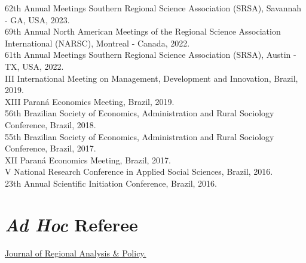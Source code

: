 \documentclass[letterpaper,11pt]{article}
\newcommand{\resumeSubHeadingListStart}{\begin{itemize}[leftmargin=0.15in, label={}]}
\newcommand{\resumeSubHeadingListEnd}{\end{itemize}}
\begin{document}
  \resumeSubHeadingListStart
    \small{\item{
        {62th Annual Meetings Southern Regional Science Association (SRSA), Savannah - GA, USA, 2023.} \\ \vspace{2pt}
        {69th Annual North American Meetings of the Regional Science Association International (NARSC), Montreal - Canada, 2022.} \\ \vspace{2pt}
        {61th Annual Meetings Southern Regional Science Association (SRSA), Austin - TX, USA, 2022.} \\ \vspace{2pt}
        {III International Meeting on Management, Development and Innovation, Brazil, 2019.} \\ \vspace{2pt}
        {XIII Paraná Economics Meeting, Brazil, 2019.} \\ \vspace{2pt}
        {56th Brazilian Society of Economics, Administration and Rural Sociology Conference, Brazil, 2018.} \\ \vspace{2pt}
        {55th Brazilian Society of Economics, Administration and Rural Sociology Conference, Brazil, 2017.} \\ \vspace{2pt}
        {XII Paraná Economics Meeting, Brazil, 2017.} \\ \vspace{2pt}
        {V National Research Conference in Applied Social Sciences, Brazil, 2016.} \\ \vspace{2pt}
        {23th Annual Scientific Initiation Conference, Brazil, 2016.} \\ \vspace{2pt}
    }}
  \resumeSubHeadingListEnd


  \section{\textit{Ad Hoc} Referee}
  \vspace{3pt}

  \resumeSubHeadingListStart
    \small{\item{
        {\href{https://jrap.scholasticahq.com/}{Journal of Regional Analysis \& Policy.}}{}} \\ \vspace{2pt}
    }
  \resumeSubHeadingListEnd
\end{document}
